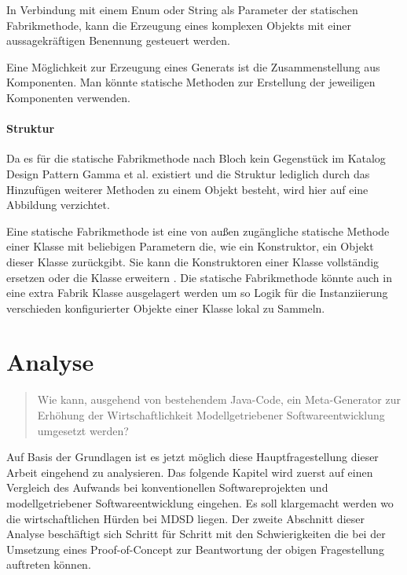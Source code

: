 \documentclass[12pt,oneside,a4paper,parskip]{scrbook}
\begin{document}
In Verbindung mit einem Enum oder String als Parameter der statischen Fabrikmethode, kann die Erzeugung eines komplexen Objekts mit einer aussagekräftigen Benennung gesteuert werden.

Eine Möglichkeit zur Erzeugung eines Generats ist die Zusammenstellung aus Komponenten. Man könnte statische Methoden zur Erstellung der jeweiligen Komponenten verwenden.

\subsubsection{Struktur}

Da es für die statische Fabrikmethode nach Bloch kein Gegenstück im Katalog Design Pattern Gamma et al. existiert \cite[S. 5]{bloch2017} und die Struktur lediglich durch das Hinzufügen weiterer Methoden zu einem Objekt besteht, wird hier auf eine Abbildung verzichtet. 

Eine statische Fabrikmethode ist eine von außen zugängliche statische Methode einer Klasse mit beliebigen Parametern die, wie ein Konstruktor, ein Objekt dieser Klasse zurückgibt. Sie kann die Konstruktoren einer Klasse vollständig ersetzen oder die Klasse erweitern \cite[S. 5f]{bloch2017}. Die statische Fabrikmethode könnte auch in eine extra Fabrik Klasse ausgelagert werden um so Logik für die Instanziierung verschieden konfigurierter Objekte einer Klasse lokal zu Sammeln.

\chapter{Analyse}

\begin{quote}\glqq Wie kann, ausgehend von bestehendem Java-Code, ein Meta-Generator zur Erhöhung der Wirtschaftlichkeit Modellgetriebener Softwareentwicklung umgesetzt werden?\grqq \end{quote}

Auf Basis der Grundlagen ist es jetzt möglich diese Hauptfragestellung dieser Arbeit eingehend zu analysieren. Das folgende Kapitel wird zuerst auf einen Vergleich des Aufwands bei konventionellen Softwareprojekten und modellgetriebener Softwareentwicklung eingehen. Es soll klargemacht werden wo die wirtschaftlichen Hürden bei MDSD liegen. Der zweite Abschnitt dieser Analyse beschäftigt sich Schritt für Schritt mit den Schwierigkeiten die bei der Umsetzung eines Proof-of-Concept zur Beantwortung der obigen Fragestellung auftreten können.
\end{document}
